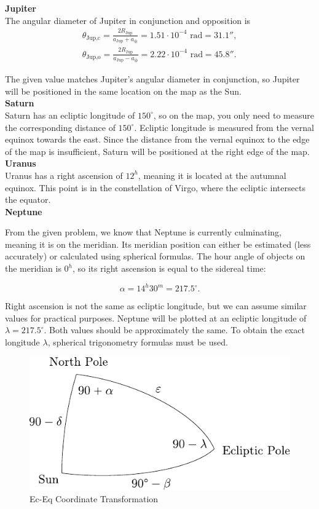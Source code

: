 \documentclass[a4paper,12pt]{extarticle}
\begin{document}
\begin{sol}
\textbf{Jupiter}\\

The angular diameter of Jupiter in conjunction and opposition is
\begin{gather*}
	\theta_{\text{Jup,c}} = \frac{2R_{\text{Jup}}}{a_{\text{Jup}} + a_{\oplus}} = 1.51 \cdot 10^{-4} \text{ rad} = 31.1'',\\
	\theta_{\text{Jup,o}} = \frac{2R_{\text{Jup}}}{a_{\text{Jup}} - a_{\oplus}} = 2.22 \cdot 10^{-4} \text{ rad} = 45.8''.
\end{gather*}


The given value matches Jupiter's angular diameter in conjunction, so Jupiter will be positioned in the same location on the map as the Sun.\\

\textbf{Saturn}\\

Saturn has an ecliptic longitude of \(150^\circ\), so on the map, you only need to measure the corresponding distance of \(150^\circ\). Ecliptic longitude is measured from the vernal equinox towards the east. Since the distance from the vernal equinox to the edge of the map is insufficient, Saturn will be positioned at the right edge of the map.\\

\textbf{Uranus}\\

Uranus has a right ascension of \(12^h\), meaning it is located at the autumnal equinox. This point is in the constellation of Virgo, where the ecliptic intersects the equator.\\

\textbf{Neptune}

From the given problem, we know that Neptune is currently culminating, meaning it is on the meridian. Its meridian position can either be estimated (less accurately) or calculated using spherical formulas. The hour angle of objects on the meridian is \(0^h\), so its right ascension is equal to the sidereal time:

\[
\alpha = 14^h 30^m = 217.5^\circ.
\]

Right ascension is not the same as ecliptic longitude, but we can assume similar values for practical purposes. Neptune will be plotted at an ecliptic longitude of \(\lambda = 217.5^\circ\). Both values should be approximately the same. To obtain the exact longitude \(\lambda\), spherical trigonometry formulas must be used.

\begin{figure}[H]
	\centering
	\includegraphics[width=0.5\linewidth]{liptosvka4.pdf}
	\caption{Ec-Eq Coordinate Transformation}
	\label{eq_ec}
\end{figure}


\end{sol}
\end{document}
